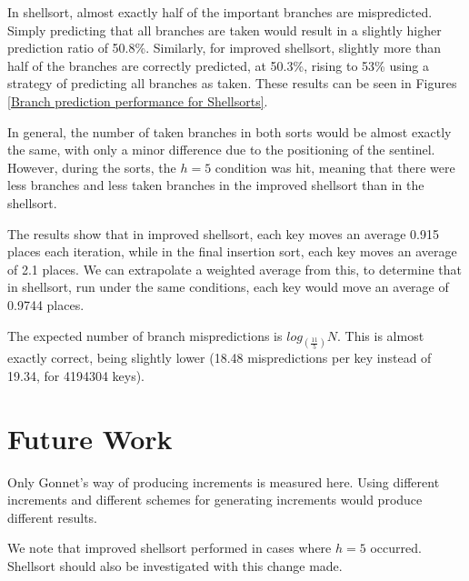 
In shellsort, almost exactly half of the important branches are mispredicted.
Simply predicting that all branches are taken would result in a slightly higher
prediction ratio of 50.8\%. Similarly, for improved shellsort, slightly more
than half of the branches are correctly predicted, at 50.3\%, rising to 53\%
using a strategy of predicting all branches as taken. These results can be seen
in Figures \ref{Branch prediction performance for Shellsorts}.

In general, the number of taken branches in both sorts would be almost exactly
the same, with only a minor difference due to the positioning of the sentinel.
However, during the sorts, the $h = 5$ condition was hit, meaning that there
were less branches and less taken branches in the improved shellsort than in the
shellsort.

The results show that in improved shellsort, each key moves an average 0.915
places each iteration, while in the final insertion sort, each key moves an
average of 2.1 places. We can extrapolate a weighted average from this, to
determine that in shellsort, run under the same conditions, each key would move
an average of 0.9744 places.

The expected number of branch mispredictions is $log_{(\frac{11}{5})}N$. This
is almost exactly correct, being slightly lower (18.48 mispredictions per key
instead of 19.34, for 4194304 keys).


\section{Future Work}

Only Gonnet's way of producing increments is measured here. Using different
increments and different schemes for generating increments would produce
different results.

We note that improved shellsort performed in cases where $h = 5$ occurred.
Shellsort should also be investigated with this change made.
